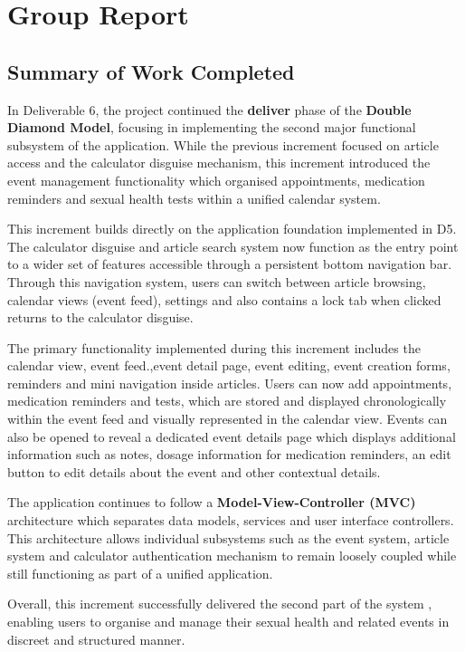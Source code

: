 \documentclass[a4paper,12pt]{article}
\begin{document}
\section{Group Report}

\subsection{Summary of Work Completed}
In Deliverable 6, the project continued the \textbf{deliver} phase of the \textbf{Double Diamond Model}, focusing in implementing the second major functional subsystem of the application. While the previous increment focused on article access and the calculator disguise mechanism, this increment introduced the event management functionality which organised appointments, medication reminders and sexual health tests within a unified calendar system.

This increment builds directly on the application foundation implemented in D5. The calculator disguise and article search system now function as the entry point to a wider set of features accessible through a persistent bottom navigation bar. Through this navigation system, users can switch between article browsing, calendar views (event feed), settings and also contains a lock tab when clicked returns to the calculator disguise. 

The primary functionality implemented during this increment includes the calendar view, event feed.,event detail page, event editing, event creation forms, reminders and mini navigation inside articles. Users can now add appointments, medication reminders and tests, which are stored and displayed chronologically within the event feed and visually represented in the calendar view. Events can also be opened to reveal a dedicated event details page which displays additional information such as notes, dosage information for medication reminders, an edit button to edit details about the event and other contextual details.

The application continues to follow a \textbf{Model-View-Controller (MVC)} architecture which separates data models, services and user interface controllers. This architecture allows individual subsystems such as the event system, article system and calculator authentication mechanism to remain loosely coupled while still functioning as part of a unified application.

Overall, this increment successfully delivered the second part of the system , enabling users to organise and manage their sexual health and related events in discreet and structured manner.
\end{document}
